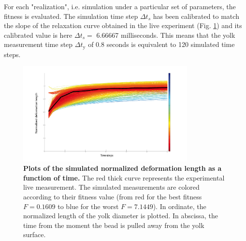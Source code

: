 For each "realization", i.e. simulation under a particular set of parameters, the fitness is evaluated. The simulation time step $\Delta\!t_s$ has been calibrated to match the slope of the relaxation curve obtained in the live experiment (Fig. \ref{Case_0_Yolk_all_curves_plot_fitness_ok}) and its calibrated value is here $\Delta\!t_s =$ 6.66667 milliseconds. This means that the yolk measurement time step $\Delta\!t_{\mathrm{y}}$ of 0.8 seconds is equivalent to 120 simulated time steps.
\begin{figure}
\begin{center}
\includegraphics[width=0.8\textwidth]{../../images/Cases_Studies/Case_0_Yolk/all_curves_plot_fitness_ok.png}
\end{center}
\caption{\textbf{Plots of the simulated normalized deformation length as a function of time.} The red thick curve represents the experimental live measurement. The simulated measurements are colored according to their fitness value (from red for the best fitness $F = 0.1609$ to blue for the worst $F = 7.1449$). In ordinate, the normalized length of the yolk diameter is plotted. In abscissa, the time from the moment the bead is pulled away from the yolk surface.}
\label{Case_0_Yolk_all_curves_plot_fitness_ok}
\end{figure}

